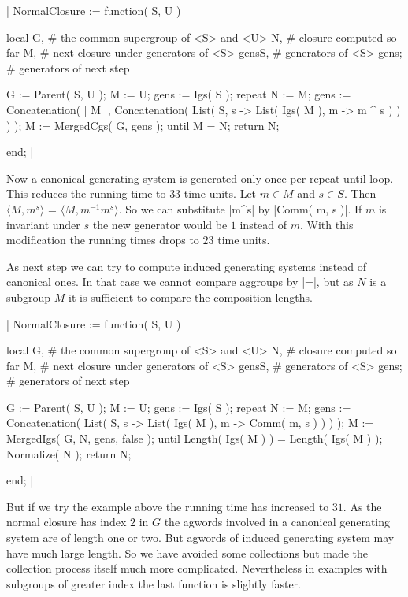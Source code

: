 |    NormalClosure := function( S, U )

        local   G,      #  the common supergroup of <S> and <U>
                N,      #  closure computed so far
                M,      #  next closure under generators of <S>
                gensS,  #  generators of <S>
                gens;   #  generators of next step

        G := Parent( S, U );
        M := U;
        gens := Igs( S );
        repeat
            N := M;
            gens := Concatenation( [ M ], Concatenation( List( S, s ->
                        List( Igs( M ), m -> m ^ s ) ) ) );
            M := MergedCgs( G, gens );
        until M = N;
        return N;

    end; |

Now   a   canonical   generating   system  is  generated  only  once  per
repeat-until loop.  This reduces the running time to $33$ time units. Let
$m\in M$  and  $s\in S$.  Then  $\langle M,  m^s \rangle$  =  $\langle M,
m^{-1}  m^s  \rangle$.  So we can substitute |m^s| by |Comm( m,  s )|. If
$m$  is  invariant  under  $s$  the new generator would be $1$ instead of
$m$. With this modification the running times drops to $23$ time units.

As  next step we can try to compute induced generating systems instead of
canonical  ones.  In that case we cannot compare aggroups by |=|,  but as
$N$  is  a  subgroup  $M$  it  is  sufficient  to compare the composition
lengths.

|    NormalClosure := function( S, U )

        local   G,      #  the common supergroup of <S> and <U>
                N,      #  closure computed so far
                M,      #  next closure under generators of <S>
                gensS,  #  generators of <S>
                gens;   #  generators of next step

        G := Parent( S, U );
        M := U;
        gens := Igs( S );
        repeat
            N := M;
            gens := Concatenation( List( S, s -> List( Igs( M ),
                        m -> Comm( m, s ) ) ) );
            M := MergedIgs( G, N, gens, false );
        until Length( Igs( M ) ) = Length( Igs( M ) );
        Normalize( N );
        return N;

    end; |

But  if  we try the example above the running time has increased to $31$.
As  the  normal  closure  has  index $2$ in $G$ the agwords involved in a
canonical  generating  system  are  of length one or two.  But agwords of
induced generating system may have much large length.  So we have avoided
some  collections  but  made  the  collection  process  itself  much more
complicated.  Nevertheless  in  examples  with subgroups of greater index
the last function is slightly faster.

